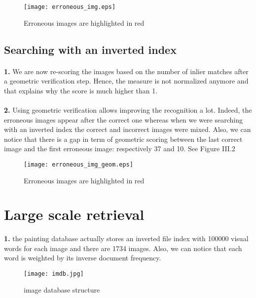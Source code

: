 \documentclass[11pt]{article}
\numberwithin{figure}{section} %
\begin{document}
\begin{figure}[!h] 
  \centering
	\texttt{[image: erroneous\_img.eps]}
  \caption{Erroneous images are highlighted in red}
\end{figure}

\subsection{Searching with an inverted index}
\paragraph{}\textbf{1.} We are now re-scoring the images based on the number of inlier matches after a geometric verification step. Hence, the measure is not normalized anymore and that explains why the score is much higher than 1.

\paragraph{}\textbf{2.} Using geometric verification allows improving the recognition a lot. Indeed, the erroneous images appear after the correct one whereas when we were searching with an inverted index the correct and incorrect images were mixed. Also, we can notice that there is a gap in term of geometric scoring between the last correct image and the first erroneous image: respectively 37 and 10. See Figure III.2

\begin{figure}[!h] 
  \centering
	\texttt{[image: erroneous\_img\_geom.eps]}
  \caption{Erroneous images are highlighted in red}
\end{figure}

\newpage

\section{Large scale retrieval}
\paragraph{}\textbf{1.} the painting database actually stores an inverted file index with 100000 visual words for each image and there are 1734 images.
Also, we can notice that each word is weighted by its inverse document frequency.

\begin{figure}[!h] 
  \centering
	\texttt{[image: imdb.jpg]}
  \caption{image database structure}
\end{figure}
\end{document}
